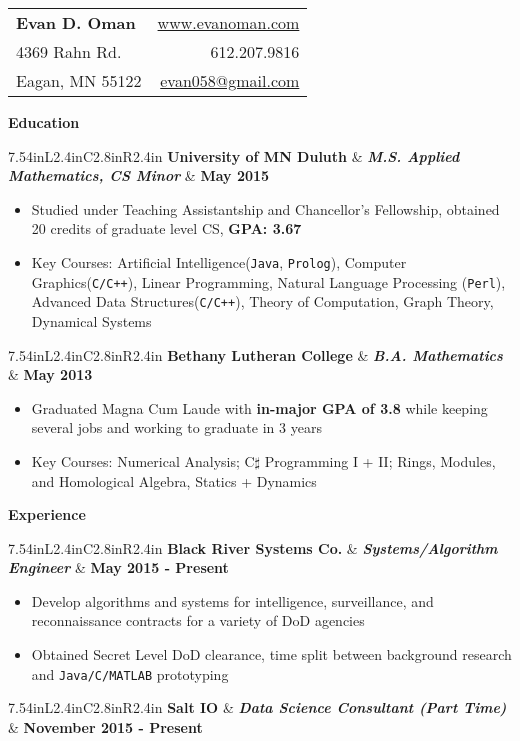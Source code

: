 \documentclass[letterpaper,10pt]{article}
\newcommand{\resitem}[1]{\item #1 

\vspace{-.1in}
}
\newcommand{\resheading}[1]{
	{
		\large\colorbox{mygrey}
		{
			\begin{minipage}{.98\textwidth}

			\centerline{\textbf{#1 \vphantom{p\^{E}}}}
			\end{minipage}
		}
	}
}
\newcommand{\rressubheading}[3]{
	\begin{tabular*}{7.54in}{L{2.4in}C{2.8in}R{2.4in}}
			\textbf{#1} & \textit{\textbf{#2}}  & \textbf{#3}
	\end{tabular*}
}
\begin{document}
	\begin{tabular*}{7.6in}{l@{\extracolsep{\fill}}r}
		\textbf{\Large Evan D. Oman}  &  \href{http://www.evanoman.com}{www.evanoman.com} \\
		4369 Rahn Rd. & 612.207.9816\\
		Eagan, MN 55122& \href{mailto:evan058@gmail.com}{evan058@gmail.com}\\
	\end{tabular*}
	\vspace{0.1in}
	\resheading{Education}
		\rressubheading{University of MN Duluth}{M.S. Applied Mathematics, CS Minor}{May 2015}
			\vspace{-.1in}
			\begin{itemize}
				\resitem{Studied under Teaching Assistantship and Chancellor's Fellowship, obtained 20 credits of graduate level CS, \textbf{GPA: 3.67}}
				\item Key Courses: Artificial Intelligence(\verb!Java!, \verb!Prolog!), Computer Graphics(\verb!C/C++!), Linear Programming, Natural Language Processing (\verb!Perl!), Advanced Data Structures(\verb!C/C++!), Theory of Computation, Graph Theory, Dynamical Systems
			\end{itemize}
		\rressubheading{Bethany Lutheran College}{B.A. Mathematics}{May 2013}
			\vspace{-.1in}
			\begin{itemize}
				\resitem{Graduated Magna Cum Laude with \textbf{in-major GPA of 3.8} while keeping several jobs and working to graduate in 3 years}
				\resitem{Key Courses: Numerical Analysis; C$\sharp$ Programming I + II; Rings, Modules, and Homological Algebra, Statics + Dynamics}
			\end{itemize}
			\vspace{.1in}
	\resheading{Experience}
		\rressubheading{Black River Systems Co.}{Systems/Algorithm Engineer}{May 2015 - Present}
			\vspace{-.1in}
			\begin{itemize}
				\resitem{Develop algorithms and systems for intelligence, surveillance, and reconnaissance contracts for a variety of DoD agencies}
				\item Obtained Secret Level DoD clearance, time split between background research and \verb!Java/C/MATLAB! prototyping
			\end{itemize}
		\rressubheading{Salt IO}{Data Science Consultant (Part Time)}{November 2015 - Present}
\end{document}
